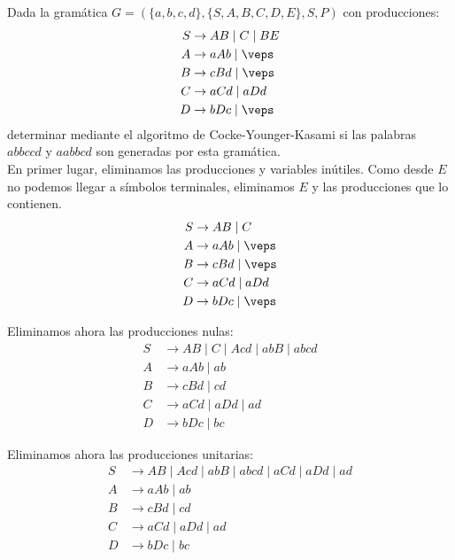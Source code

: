 \begin{ejercicio}\label{ej:1.6.15}
    Dada la gramática $G=(\{a,b,c,d\},\{S,A,B,C,D,E\},S,P)$ con producciones:
    \begin{align*}
        S &\rightarrow AB \mid C \mid BE \\
        A &\rightarrow aAb \mid \veps \\
        B &\rightarrow cBd \mid \veps \\
        C &\rightarrow aCd \mid aDd \\
        D &\rightarrow bDc \mid \veps
    \end{align*}
    determinar mediante el algoritmo de Cocke-Younger-Kasami si las palabras $abbccd$ y $aabbcd$ son generadas por esta gramática.\\

    En primer lugar, eliminamos las producciones y variables inútiles. Como desde $E$ no podemos llegar a símbolos terminales, eliminamos $E$ y las producciones que lo contienen.
    \begin{align*}
        S &\rightarrow AB \mid C \\
        A &\rightarrow aAb \mid \veps \\
        B &\rightarrow cBd \mid \veps \\
        C &\rightarrow aCd \mid aDd \\
        D &\rightarrow bDc \mid \veps
    \end{align*}

    Eliminamos ahora las producciones nulas:
    \begin{align*}
        S &\rightarrow AB \mid C \mid Acd\mid abB \mid abcd\\
        A &\rightarrow aAb \mid ab \\
        B &\rightarrow cBd \mid cd \\
        C &\rightarrow aCd \mid aDd \mid ad\\
        D &\rightarrow bDc \mid bc
    \end{align*}

    Eliminamos ahora las producciones unitarias:
    \begin{align*}
        S &\rightarrow AB \mid Acd\mid abB \mid abcd \mid aCd \mid aDd \mid ad\\
        A &\rightarrow aAb \mid ab \\
        B &\rightarrow cBd \mid cd \\
        C &\rightarrow aCd \mid aDd \mid ad\\
        D &\rightarrow bDc \mid bc
    \end{align*}


\end{ejercicio}
